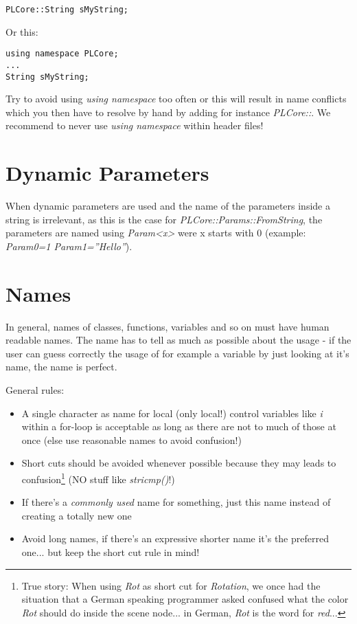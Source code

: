 \begin{lstlisting}[caption=Explicit namespace]
PLCore::String sMyString;
\end{lstlisting}

Or this:

\begin{lstlisting}[caption=Using namespace]
using namespace PLCore;
...
String sMyString;
\end{lstlisting}

Try to avoid using \emph{using namespace} too often or this will result in name conflicts which you then have to resolve by hand by adding for instance \emph{PLCore::}. We recommend to never use \emph{using namespace} within header files!




\section{Dynamic Parameters}
When dynamic parameters are used and the name of the parameters inside a string is irrelevant, as this is the case for \emph{PLCore::Params::FromString}, the parameters are named using \emph{Param<x>} were x starts with $0$ (example: \emph{Param0=1 Param1=''Hello''}).  




\section{Names}
In general, names of classes, functions, variables and so on must have human readable names. The name has to tell as much as possible about the usage - if the user can guess correctly the usage of for example a variable by just looking at it's name, the name is perfect.

General rules:

\begin{itemize}
\item A single character as name for local (only local!) control variables like \emph{i} within a for-loop is acceptable as long as there are not to much of those at once (else use reasonable names to avoid confusion!)
\item Short cuts should be avoided whenever possible because they may leads to confusion\footnote{True story: When using \emph{Rot} as short cut for \emph{Rotation}, we once had the situation that a German speaking programmer asked confused what the color \emph{Rot} should do inside the scene node... in German, \emph{Rot} is the word for \emph{red}...} (NO stuff like \emph{stricmp()}!)
\item If there's a \emph{commonly used} name for something, just this name instead of creating a totally new one
\item Avoid long names, if there's an expressive shorter name it's the preferred one... but keep the short cut rule in mind!
\end{itemize}

